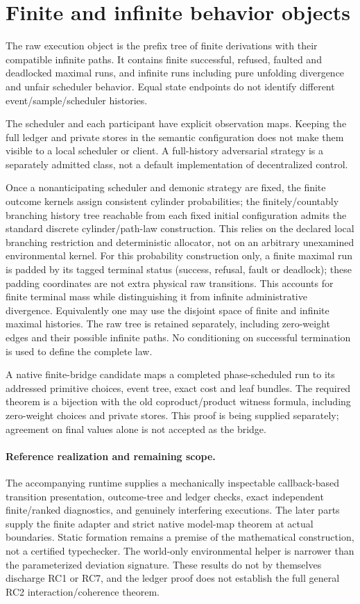 \documentclass[11pt]{article}
\begin{document}
\section{Finite and infinite behavior objects}
The raw execution object is the prefix tree of finite derivations with their compatible infinite paths. It contains finite successful, refused, faulted and deadlocked maximal runs, and infinite runs including pure unfolding divergence and unfair scheduler behavior. Equal state endpoints do not identify different event/sample/scheduler histories.

The scheduler and each participant have explicit observation maps. Keeping the full ledger and private stores in the semantic configuration does not make them visible to a local scheduler or client. A full-history adversarial strategy is a separately admitted class, not a default implementation of decentralized control.

Once a nonanticipating scheduler and demonic strategy are fixed, the finite outcome kernels assign consistent cylinder probabilities; the finitely/countably branching history tree reachable from each fixed initial configuration admits the standard discrete cylinder/path-law construction. This relies on the declared local branching restriction and deterministic allocator, not on an arbitrary unexamined environmental kernel. For this probability construction only, a finite maximal run is padded by its tagged terminal status (success, refusal, fault or deadlock); these padding coordinates are not extra physical raw transitions. This accounts for finite terminal mass while distinguishing it from infinite administrative divergence. Equivalently one may use the disjoint space of finite and infinite maximal histories. The raw tree is retained separately, including zero-weight edges and their possible infinite paths. No conditioning on successful termination is used to define the complete law.

A native finite-bridge candidate maps a completed phase-scheduled run to its addressed primitive choices, event tree, exact cost and leaf bundles. The required theorem is a bijection with the old coproduct/product witness formula, including zero-weight choices and private stores. This proof is being supplied separately; agreement on final values alone is not accepted as the bridge.

\paragraph{Reference realization and remaining scope.}
The accompanying runtime supplies a mechanically inspectable callback-based transition presentation, outcome-tree and ledger checks, exact independent finite/ranked diagnostics, and genuinely interfering executions. The later parts supply the finite adapter and strict native model-map theorem at actual boundaries. Static formation remains a premise of the mathematical construction, not a certified typechecker. The world-only environmental helper is narrower than the parameterized deviation signature. These results do not by themselves discharge RC1 or RC7, and the ledger proof does not establish the full general RC2 interaction/coherence theorem.
\end{document}
